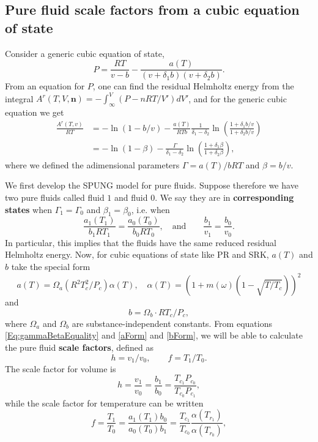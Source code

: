 \documentclass[english]{../thermomemo/thermomemo}
\newcommand{\mbn}[0]{\mathbf n}
\newcommand{\lp}{\left(}
\newcommand{\rp}{\right)}
\numberwithin{equation}{section}
\begin{document}
\subsection{Pure fluid scale factors from a cubic equation of state} %
Consider a generic cubic equation of state,
$$
P = \frac{RT}{v-b}-\frac{a(T)}{(v+\delta_1 b)(v+\delta_2 b)}.
$$
From an equation for $P$, one can find the residual Helmholtz energy from the integral
$A^r(T,V,\mbn) = -\int_\infty^V \lp P - nRT/V' \rp dV'$, and for the
generic cubic equation we
get
\begin{align}
  \frac{A^r(T,v)}{RT} &= -\ln(1-b/v)-\frac{a(T)}{RTb}\frac{1}{\delta_1-\delta_2}\ln \lp \frac{1+\delta_1 b/v}{1+\delta_2 b/v} \rp \\[1.5pt]
  &= -\ln(1-\beta) - \frac{\Gamma}{\delta_1-\delta_2} \ln \lp
  \frac{1+\delta_1 \beta}{1+\delta_2 \beta} \rp, \label{Ar_pure}
\end{align}
where we defined the adimensional parameters $\Gamma = a(T)/bRT$ and
$\beta=b/v$.

We first develop the SPUNG model for pure fluids. Suppose therefore we have two pure fluids called fluid $1$ and fluid $0$. We say they are in \textbf{corresponding states} when $\Gamma_1 =
\Gamma_0$ and $\beta_1 = \beta_0$, i.e. when
\begin{equation}
  \label{Eq:gammaBetaEquality}
  \frac{a_1(T_1)}{b_1 R T_1} = \frac{a_0(T_0)}{b_0 R T_0}, \quad \text{and} \qquad \frac{b_1}{v_1} = \frac{b_0}{v_0}.
\end{equation}
In particular, this implies that the fluids have the same reduced residual Helmholtz energy. Now, for cubic equations of state like PR and SRK, $a(T)$ and $b$ take the special form
\begin{equation}
  \label{aForm}
  a(T) = \Omega_a (R^2T_c^2/P_c) \alpha(T), \quad \alpha(T) =\lp 1+m(\omega)(1-\sqrt{T/T_c}) \rp^2 %
\end{equation}
and
\begin{equation}
  \label{bForm}
  b = \Omega_b \cdot RT_c/P_c,
\end{equation}
where $\Omega_a$ and $\Omega_b$ are substance-independent constants. From equations \eqref{Eq:gammaBetaEquality} and \eqref{aForm} and \eqref{bForm}, we will be able to calculate the pure
fluid \textbf{scale factors}, defined as
$$
h = v_1/v_0, \qquad f =
T_1/T_0. %
$$
The scale factor for volume is
\begin{equation}
  \label{eq:h1}
  h = \frac{v_1}{v_0} = \frac{b_1}{b_0} = \frac{T_{c_1}P_{c_0}}{T_{c_0}P_{c_1}},
\end{equation}
while the scale factor for temperature can be written
\begin{equation}
  \label{eq:f1}
  f = \frac{T_1}{T_0} = \frac{a_1(T_1) b_0}{a_0(T_0) b_1} = \frac{T_{c_1}}{T_{c_0}} \frac{\alpha(T_{r_1})}{\alpha(T_{r_0})},
\end{equation}
\end{document}
